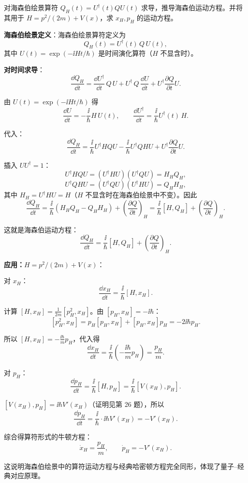 \begin{question}
对海森伯绘景算符 $Q_H(t)=U^\dagger(t)QU(t)$ 求导，推导海森伯运动方程。并将其用于 $H=p^2/(2m)+V(x)$，求 $x_H,p_H$ 的运动方程。
\end{question}
\begin{solution}
	\textbf{海森伯绘景定义}：海森伯绘景算符定义为
	\[
	Q_H(t) = U^\dagger(t)\,Q\,U(t),
	\]
	其中 $U(t)=\exp(-\ii Ht/\hbar)$ 是时间演化算符（$H$ 不显含时）。

	\textbf{对时间求导}：
	\[
	\frac{\dd Q_H}{\dd t} = \frac{\dd U^\dagger}{\dd t}\,Q\,U + U^\dagger\,Q\,\frac{\dd U}{\dd t} + U^\dagger\frac{\partial Q}{\partial t}U.
	\]

	由 $U(t)=\exp(-\ii Ht/\hbar)$ 得
	\[
	\frac{\dd U}{\dd t} = -\frac{\ii}{\hbar}H\,U(t),\qquad
	\frac{\dd U^\dagger}{\dd t} = \frac{\ii}{\hbar}U^\dagger(t)\,H.
	\]

	代入：
	\[
	\frac{\dd Q_H}{\dd t} = \frac{\ii}{\hbar}U^\dagger H Q U - \frac{\ii}{\hbar}U^\dagger Q H U + U^\dagger\frac{\partial Q}{\partial t}U.
	\]

	插入 $UU^\dagger=1$：
	\[
	U^\dagger H Q U = (U^\dagger H U)(U^\dagger Q U) = H_H Q_H,
	\]
	\[
	U^\dagger Q H U = (U^\dagger Q U)(U^\dagger H U) = Q_H H_H,
	\]
	其中 $H_H=U^\dagger H U = H$（$H$ 不显含时在海森伯绘景中不变）。因此
	\[
	\frac{\dd Q_H}{\dd t} = \frac{\ii}{\hbar}(H_H Q_H - Q_H H_H) + \left(\frac{\partial Q}{\partial t}\right)_H
	= \frac{\ii}{\hbar}[H,Q_H] + \left(\frac{\partial Q}{\partial t}\right)_H.
	\]

	这就是海森伯运动方程：
	\[
	\boxed{\frac{\dd Q_H}{\dd t} = \frac{\ii}{\hbar}[H,Q_H] + \left(\frac{\partial Q}{\partial t}\right)_H}.
	\]

	\textbf{应用：$H=p^2/(2m)+V(x)$}：

	对 $x_H$：
	\[
	\frac{\dd x_H}{\dd t} = \frac{\ii}{\hbar}[H,x_H].
	\]

	计算 $[H,x_H] = \frac{1}{2m}[p_H^2,x_H]$。由 $[p_H,x_H]=-\ii\hbar$：
	\[
	[p_H^2,x_H] = p_H[p_H,x_H] + [p_H,x_H]p_H = -2\ii\hbar p_H.
	\]

	所以 $[H,x_H] = -\frac{\ii\hbar}{m}p_H$，代入得
	\[
	\frac{\dd x_H}{\dd t} = \frac{\ii}{\hbar}\left(-\frac{\ii\hbar}{m}p_H\right) = \frac{p_H}{m}.
	\]

	对 $p_H$：
	\[
	\frac{\dd p_H}{\dd t} = \frac{\ii}{\hbar}[H,p_H] = \frac{\ii}{\hbar}[V(x_H),p_H].
	\]

	$[V(x_H),p_H] = \ii\hbar V'(x_H)$（证明见第 26 题），所以
	\[
	\frac{\dd p_H}{\dd t} = \frac{\ii}{\hbar}\cdot\ii\hbar V'(x_H) = -V'(x_H).
	\]

	综合得算符形式的牛顿方程：
	\[
	\boxed{\dot x_H = \frac{p_H}{m}},\qquad
	\boxed{\dot p_H = -V'(x_H)}.
	\]

	这说明海森伯绘景中的算符运动方程与经典哈密顿方程完全同形，体现了量子--经典对应原理。
	\end{solution}

